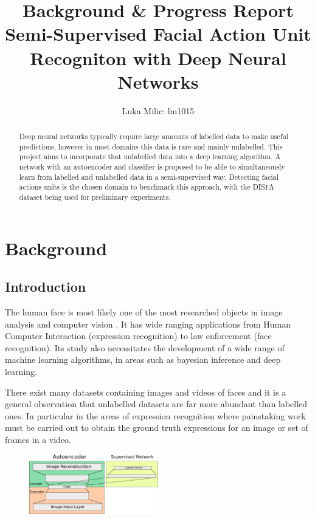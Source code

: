 \documentclass[9pt]{article} \usepackage{amsmath, amsthm, amssymb}
\title{{Background \& Progress Report}\\{\large Semi-Supervised Facial Action Unit Recogniton with Deep Neural Networks}}
\author{Luka Milic: lm1015}
\begin{document}
\maketitle

\begin{abstract}
    Deep neural networks typically require large amounts of labelled data to make useful
    predictions, however in most domains this data is rare and mainly unlabelled.
    This project aims to incorporate that unlabelled data into a deep learning algorithm.
    A network with an autoencoder and classifier is proposed to be able to simultaneously
    learn from labelled and unlabelled data in a semi-supervised way. Detecting
    facial actions units is the chosen domain to benchmark this approach, with
    the DISFA dataset being used for preliminary experiments.
\end{abstract}
%
%
%
\section{Background}
\subsection{Introduction}
The human face is most likely one of the most researched objects in image analysis
and computer vision \cite{S.ZafeiriouA.PapaioannouI.KotsiaM.A.Nicolaou}.
It has wide ranging applications from Human
Computer Interaction (expression recognition) to law enforcement (face recognition).
Its study also necessitates the development of a wide range of machine
learning algorithms, in areas such as bayesian inference and deep learning.

There exist many datasets containing images and videos of faces and it is a general
observation that unlabelled datasets are far more abundant than labelled ones.
In particular in the areas of expression recognition where painstaking work
must be carried out to obtain the ground truth expressions for an image or set of
frames in a video.

\begin{figure}
 \centering
 \includegraphics[width=0.5\textwidth]{illustrations/network_01.pdf}
\end{figure}
\end{document}
